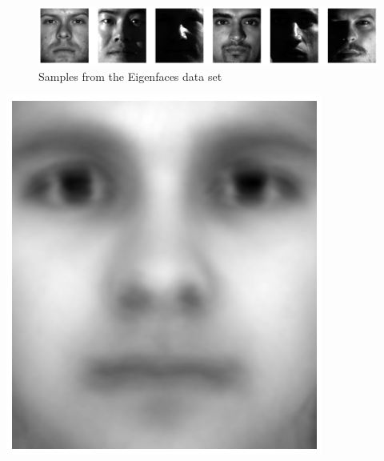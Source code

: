 \begin{center}
    \begin{figure}[h]
      \centering
      \includegraphics[width=0.86\linewidth]{external_content/media/eigenfaces.png}
      \captionsetup{justification=centering}
      \caption{Samples from the Eigenfaces data set \cite{georghiades2001few}}
      \label{fig:eigenfaces}
    \end{figure}
\end{center}
\vspace{-8mm}


\begin{minipage}[h][120mm][t]{0.35\linewidth}
    \begin{center}
        \includegraphics[width=0.81\linewidth]{external_content/media/eigenfaces/average_face.png}
        \captionsetup{justification=centering,type=htypei}
        \label{fig:eigenfaceAVG}
    \end{center}
    \begin{center}

\end{center}
\end{minipage}
